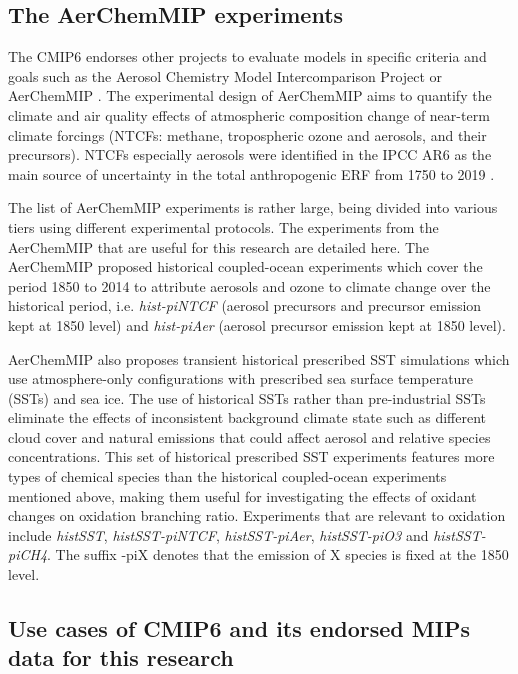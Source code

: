 \subsection{The AerChemMIP experiments}

The CMIP6 endorses other projects to evaluate models in specific criteria and goals such as the Aerosol Chemistry Model Intercomparison Project or AerChemMIP \citep{collinsAerChemMIPQuantifyingEffects2017}. The experimental design of AerChemMIP aims to quantify the climate and air quality effects of atmospheric composition change of near-term climate forcings (NTCFs: methane, tropospheric ozone and aerosols, and their precursors). NTCFs especially aerosols were identified in the IPCC AR6 as the main source of uncertainty in the total anthropogenic ERF from 1750 to 2019 \citep[see figure \ref{fig:1.ERF} and][]{forsterEarthEnergyBudget2021}.

The list of AerChemMIP experiments is rather large, being divided into various tiers using different experimental protocols. The experiments from the AerChemMIP that are useful for this research are detailed here. The AerChemMIP proposed historical coupled-ocean experiments which cover the period 1850 to 2014 to attribute aerosols and ozone to climate change over the historical period, i.e. \textit{hist-piNTCF} (aerosol precursors and  precursor emission kept at 1850 level) and \textit{hist-piAer} (aerosol precursor emission kept at 1850 level). 

AerChemMIP also proposes transient historical prescribed SST simulations which use atmosphere-only configurations with prescribed sea surface temperature (SSTs) and sea ice. The use of historical SSTs rather than pre-industrial SSTs eliminate the effects of inconsistent background climate state such as different cloud cover and natural emissions that could affect aerosol and relative species concentrations. This set of historical prescribed SST experiments features more types of chemical species than the historical coupled-ocean experiments mentioned above, making them useful for investigating the effects of oxidant changes on oxidation branching ratio. Experiments that are relevant to  oxidation include \textit{histSST}, \textit{histSST-piNTCF}, \textit{histSST-piAer}, \textit{histSST-piO3} and \textit{histSST-piCH4}. The suffix -piX denotes that the emission of X species is fixed at the 1850 level.


\subsection{Use cases of CMIP6 and its endorsed MIPs data for this research}

